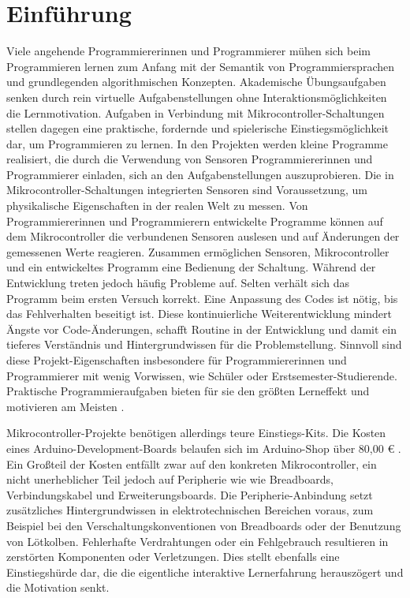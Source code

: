 \documentclass[11pt,a4paper]{report}
\begin{document}
\chapter{Einführung} \label{chap:intro}
Viele angehende Programmiererinnen und Programmierer mühen sich beim Programmieren lernen zum Anfang mit der Semantik von Programmiersprachen und grundlegenden algorithmischen Konzepten.
Akademische Übungsaufgaben senken durch rein virtuelle Aufgabenstellungen ohne Interaktionsmöglichkeiten die Lernmotivation.
Aufgaben in Verbindung mit Mikrocontroller-Schaltungen stellen dagegen eine praktische, fordernde und spielerische Einstiegsmöglichkeit dar, um Programmieren zu lernen.
In den Projekten werden kleine Programme realisiert, die durch die Verwendung von Sensoren Programmiererinnen und Programmierer einladen, sich an den Aufgabenstellungen auszuprobieren.
Die in Mikrocontroller-Schaltungen integrierten Sensoren sind Voraussetzung, um physikalische Eigenschaften in der realen Welt zu messen.
Von Programmiererinnen und Programmierern entwickelte Programme können auf dem Mikrocontroller die verbundenen Sensoren auslesen und auf Änderungen der gemessenen Werte reagieren.
Zusammen ermöglichen Sensoren, Mikrocontroller und ein entwickeltes Programm eine Bedienung der Schaltung.
Während der Entwicklung treten jedoch häufig Probleme auf.
Selten verhält sich das Programm beim ersten Versuch korrekt.
Eine Anpassung des Codes ist nötig, bis das Fehlverhalten beseitigt ist.
Diese kontinuierliche Weiterentwicklung mindert Ängste vor Code-Änderungen, schafft Routine in der Entwicklung und damit ein tieferes Verständnis und Hintergrundwissen für die Problemstellung.
Sinnvoll sind diese Projekt-Eigenschaften insbesondere für Programmiererinnen und Programmierer mit wenig Vorwissen, wie Schüler oder Erstsemester-Studierende.
Praktische Programmieraufgaben bieten für sie den größten Lerneffekt und motivieren am Meisten \cite{learning_computer_programming}.

Mikrocontroller-Projekte benötigen allerdings teure Einstiegs-Kits.
Die Kosten eines Arduino-Development-Boards belaufen sich im Arduino-Shop über 80,00 € \cite{arduino_kit}.
Ein Großteil der Kosten entfällt zwar auf den konkreten Mikrocontroller, ein nicht unerheblicher Teil jedoch auf Peripherie wie wie Breadboards, Verbindungskabel und Erweiterungsboards.
Die Peripherie-Anbindung setzt zusätzliches Hintergrundwissen in elektrotechnischen Bereichen voraus, zum  Beispiel bei den Verschaltungskonventionen von Breadboards oder der Benutzung von Lötkolben.
Fehlerhafte Verdrahtungen oder ein Fehlgebrauch resultieren in zerstörten Komponenten oder Verletzungen.
Dies stellt ebenfalls eine Einstiegshürde dar, die die eigentliche interaktive Lernerfahrung herauszögert und die Motivation senkt.
\end{document}
